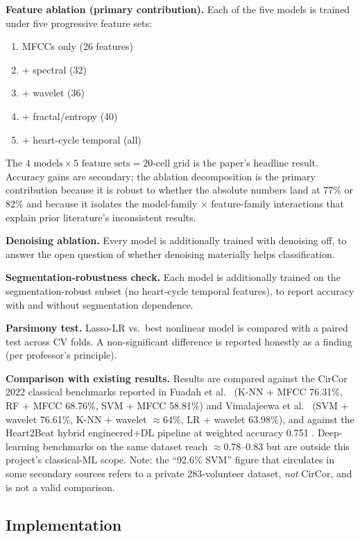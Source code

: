 \documentclass[10pt,twocolumn]{article}
\begin{document}
\textbf{Feature ablation (primary contribution).} Each of the five models is trained under five progressive feature sets:
\begin{enumerate}[label=(\alph*)]
    \item MFCCs only (26 features)
    \item + spectral (32)
    \item + wavelet (36)
    \item + fractal/entropy (40)
    \item + heart-cycle temporal (all)
\end{enumerate}
The $4 \text{ models} \times 5 \text{ feature sets} = 20$-cell grid is the paper's headline result. Accuracy gains are secondary; the ablation decomposition is the primary contribution because it is robust to whether the absolute numbers land at 77\% or 82\% and because it isolates the model-family $\times$ feature-family interactions that explain prior literature's inconsistent results.

\textbf{Denoising ablation.} Every model is additionally trained with denoising off, to answer the open question of whether denoising materially helps classification.

\textbf{Segmentation-robustness check.} Each model is additionally trained on the segmentation-robust subset (no heart-cycle temporal features), to report accuracy with and without segmentation dependence.

\textbf{Parsimony test.} Lasso-LR vs.\ best nonlinear model is compared with a paired test across CV folds. A non-significant difference is reported honestly as a finding (per professor's principle).

\textbf{Comparison with existing results.} Results are compared against the CirCor 2022 classical benchmarks reported in Fuadah et al.\ \citep{fuadah2023} (K-NN + MFCC 76.31\%, RF + MFCC 68.76\%, SVM + MFCC 58.81\%) and Vimalajeewa et al.\ \citep{wavelet2025} (SVM + wavelet 76.61\%, K-NN + wavelet $\approx$64\%, LR + wavelet 63.98\%), and against the Heart2Beat hybrid engineered+DL pipeline at weighted accuracy 0.751 \citep{rohr2024heart2beat}. Deep-learning benchmarks on the same dataset reach $\approx$0.78--0.83 \citep{challenge2022, walker2022dbres} but are outside this project's classical-ML scope. Note: the ``92.6\% SVM'' figure that circulates in some secondary sources refers to a private 283-volunteer dataset, \textit{not} CirCor, and is not a valid comparison.

\subsection{Implementation}
\end{document}
